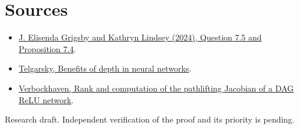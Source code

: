 \documentclass[11pt]{article}
\begin{document}
\section*{Sources}
\begin{itemize}
\item \href{https://arxiv.org/abs/2410.17191}{J. Elisenda Grigsby and Kathryn Lindsey (2024), Question 7.5 and Proposition 7.4}.
\item \href{https://proceedings.mlr.press/v49/telgarsky16.html}{Telgarsky, Benefits of depth in neural networks}.
\item \href{https://arxiv.org/abs/2609.18682}{Verbockhaven, Rank and computation of the pathlifting Jacobian of a DAG ReLU network}.
\end{itemize}
{\small Research draft. Independent verification of the proof and its priority is pending.}
\end{document}
